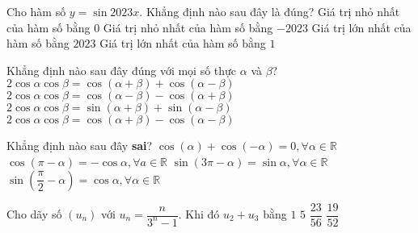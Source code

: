 \begin{ex}%
	Cho hàm số $y = \sin 2023x$. Khẳng định nào sau đây là đúng?
	\choice
	{Giá trị nhỏ nhất của hàm số bằng $0$}
	{Giá trị nhỏ nhất của hàm số bằng $-2023$}
	{Giá trị lớn nhất của hàm số bằng $2023$}
	{\True Giá trị lớn nhất của hàm số bằng $1$}
\end{ex}

\begin{ex}%
	Khẳng định nào sau đây đúng với mọi số thực $\alpha$ và $\beta$?
	\choice
	{\True $2\cos \alpha\cos \beta=\cos(\alpha+\beta)+\cos (\alpha-\beta)$}
	{$2\cos \alpha\cos \beta=\cos(\alpha-\beta)-\cos (\alpha+\beta)$}
	{$2\cos \alpha\cos \beta=\sin(\alpha+\beta)+\sin (\alpha-\beta)$}
	{$2\cos \alpha\cos \beta=\cos(\alpha+\beta)-\cos (\alpha-\beta)$}
\end{ex}
\begin{ex}%
	Khẳng định nào sau đây \textbf{sai}?
	\choice
	{\True $\cos (\alpha)+\cos (-\alpha)=0, \forall \alpha \in \mathbb{R}$}
	{$\cos (\pi-\alpha)=-\cos \alpha, \forall a \in \mathbb{R}$}
	{$\sin (3 \pi-\alpha)=\sin \alpha, \forall \alpha \in \mathbb{R}$}
	{$\sin \left(\dfrac{\pi}{2}-\alpha\right)=\cos \alpha, \forall \alpha \in \mathbb{R}$}
\end{ex}

\begin{ex}%
	Cho dãy số $\left(u_{n}\right)$ với $u_{n}=\dfrac{n}{3^{n}-1}$. Khi đó $u_2+u_3$ bằng 
	\choice
	{$1$}
	{$5$}
	{$\dfrac{23}{56}$}
	{\True $\dfrac{19}{52}$}
\end{ex}

